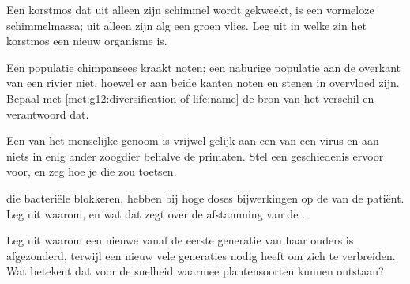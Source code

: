 \begin{exercise}[$\star\star$]\label{exo:g12:diversification-of-life:10}
Een korstmos dat uit alleen zijn schimmel wordt gekweekt, is een vormeloze
schimmelmassa; uit alleen zijn alg een groen vlies. Leg uit in welke zin
het korstmos een nieuw  organisme is.
\end{exercise}

\begin{exercise}[$\star\star$]\label{exo:g12:diversification-of-life:11}
Een populatie chimpansees kraakt noten; een naburige populatie aan de
overkant van een rivier niet, hoewel er aan beide kanten noten en stenen
in overvloed zijn. Bepaal met \cref{met:g12:diversification-of-life:name}
de bron van het verschil en verantwoord dat.
\end{exercise}

\begin{exercise}[$\star\star\star$]\label{exo:g12:diversification-of-life:12}
Een  van het menselijke genoom is vrijwel gelijk aan een  van een
virus en aan niets in enig ander zoogdier behalve de primaten. Stel een
geschiedenis ervoor voor, en zeg hoe je die zou toetsen.
\end{exercise}

\begin{exercise}[$\star\star\star$]\label{exo:g12:diversification-of-life:13}
 die bacteriële  blokkeren, hebben bij hoge doses
bijwerkingen op de  van de patiënt. Leg uit waarom, en wat
dat zegt over de afstamming van de .
\end{exercise}

\begin{exercise}[$\star\star\star$]\label{exo:g12:diversification-of-life:14}
Leg uit waarom een nieuwe   vanaf de eerste generatie van
haar ouders is afgezonderd, terwijl een nieuw  vele generaties nodig
heeft om zich te verbreiden. Wat betekent dat voor de snelheid waarmee
plantensoorten kunnen ontstaan?
\end{exercise}

